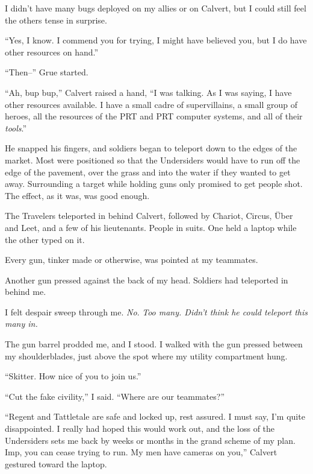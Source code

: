 I didn't have many bugs deployed on my allies or on Calvert, but I could still feel the others tense in surprise.



``Yes, I know.  I commend you for trying, I might have believed you, but I do have other resources on hand.''



``Then--'' Grue started.



``Ah, bup bup,'' Calvert raised a hand, ``I was talking.  As I was saying, I have other resources available.  I have a small cadre of supervillains, a small group of heroes, all the resources of the PRT and PRT computer systems, and all of their \emph{tools}.''



He snapped his fingers, and soldiers began to teleport down to the edges of the market.  Most were positioned so that the Undersiders would have to run off the edge of the pavement, over the grass and into the water if they wanted to get away.  Surrounding a target while holding guns only promised to get people shot.  The effect, as it was, was good enough.



The Travelers teleported in behind Calvert, followed by Chariot, Circus, \"{U}ber and Leet, and a few of his lieutenants.  People in suits.  One held a laptop while the other typed on it.



Every gun, tinker made or otherwise, was pointed at my teammates.



Another gun pressed against the back of my head.  Soldiers had teleported in behind me.



I felt despair sweep through me.  \emph{No}.\emph{  Too many.  Didn't think he could teleport this many in.}



The gun barrel prodded me, and I stood.  I walked with the gun pressed between my shoulderblades, just above the spot where my utility compartment hung.



``Skitter.  How nice of you to join us.''



``Cut the fake civility,'' I said.  ``Where are our teammates?''



``Regent and Tattletale are safe and locked up, rest assured.  I must say, I'm quite disappointed.  I really had hoped this would work out, and the loss of the Undersiders sets me back by weeks or months in the grand scheme of my plan.  Imp, you can cease trying to run.  My men have cameras on you,'' Calvert gestured toward the laptop.




